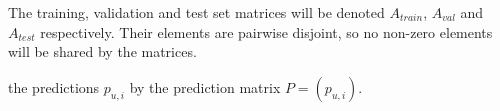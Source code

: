 






The training, validation and test set matrices will be denoted $A_{train}$, $A_{val}$ and $A_{test}$ respectively. Their elements are pairwise disjoint, so no non-zero elements will be shared by the matrices.

the predictions $p_{u, i}$ by the prediction matrix $P = (p_{u, i})$.


